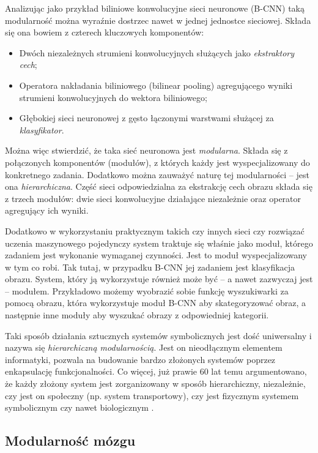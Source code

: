 Analizując jako przykład biliniowe konwolucyjne sieci neuronowe (B-CNN) \cite{lin2015bilinear} taką modularność można wyraźnie dostrzec nawet w jednej jednostce sieciowej.
Składa się ona bowiem z czterech kluczowych komponentów:
\begin{itemize}
	\item Dwóch niezależnych strumieni konwolucyjnych służących jako \emph{ekstraktory cech};
	\item Operatora nakładania biliniowego (bilinear pooling) agregującego wyniki strumieni konwolucyjnych do wektora biliniowego;
	\item Głębokiej sieci neuronowej z gęsto łączonymi warstwami służącej za \emph{klasyfikator}.
\end{itemize}
Można więc stwierdzić, że taka sieć neuronowa jest \emph{modularna}. Składa się z połączonych komponentów (modułów), z których każdy jest wyspecjalizowany do konkretnego zadania.
Dodatkowo można zauważyć naturę tej modularności -- jest ona \emph{hierarchiczna}.
Część sieci odpowiedzialna za ekstrakcję cech obrazu składa się z trzech modułów: dwie sieci konwolucyjne działające niezależnie oraz operator agregujący ich wyniki.

Dodatkowo w wykorzystaniu praktycznym takich czy innych sieci czy rozwiązać uczenia maszynowego pojedynczy system traktuje się właśnie jako moduł, którego zadaniem jest wykonanie wymaganej czynności.
Jest to moduł wyspecjalizowany w tym co robi.
Tak tutaj, w przypadku B-CNN jej zadaniem jest klasyfikacja obrazu.
System, który ją wykorzystuje również może być -- a nawet zazwyczaj jest -- modułem.
Przykładowo możemy wyobrazić sobie funkcję wyszukiwarki za pomocą obrazu, która wykorzystuje moduł B-CNN aby skategoryzować obraz, a następnie inne moduły aby wyszukać obrazy z odpowiedniej kategorii.

Taki sposób działania sztucznych systemów symbolicznych jest dość uniwersalny i nazywa się \emph{hierarchiczną modularnością}.
Jest on nieodłącznym elementem informatyki, pozwala na budowanie bardzo złożonych systemów poprzez enkapsulację funkcjonalności.
Co więcej, już prawie 60 lat temu argumentowano, że każdy złożony system jest zorganizowany w sposób hierarchiczny, niezależnie, czy jest on społeczny (np. system transportowy), czy jest fizycznym systemem symbolicznym czy nawet biologicznym \cite{simon1962architecture}.

\subsection{Modularność mózgu}

